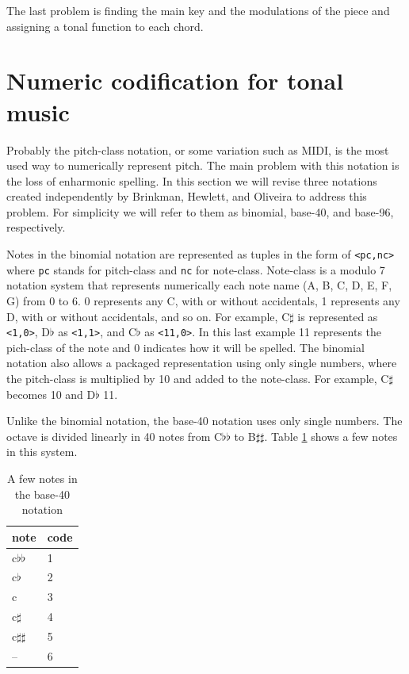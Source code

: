 \documentclass{article}
\begin{document}
The last problem is finding the main key and the modulations of the
piece and assigning a tonal function to each chord.

\section{Numeric codification for tonal music}
\label{sec:codificacao-jamary}

Probably the pitch-class notation, or some variation such as MIDI, is
the most used way to numerically represent pitch. The main problem
with this notation is the loss of enharmonic spelling. In this section
we will revise three notations created independently by Brinkman,
Hewlett, and Oliveira \cite{brinkman:binomial,
  hewlett:base-40, oliveira:busca} to address this problem.
For simplicity we will refer to them as binomial, base-40, and
base-96, respectively.

Notes in the binomial notation are represented as tuples in the form
of \texttt{<pc,nc>} where \texttt{pc} stands for pitch-class and
\texttt{nc} for note-class. Note-class is a modulo 7 notation system
that represents numerically each note name (A, B, C, D, E, F, G) from
0 to 6. 0 represents any C, with or without accidentals, 1 represents
any D, with or without accidentals, and so on. For example, C$\sharp$
is represented as \texttt{<1,0>}, D$\flat$ as \texttt{<1,1>}, and C$\flat$
as \texttt{<11,0>}. In this last example 11 represents the pich-class of the
note and 0 indicates how it will be spelled. The binomial notation
also allows a packaged representation using only single numbers, where
the pitch-class is multiplied by 10 and added to the note-class. For
example, C$\sharp$ becomes 10 and D$\flat$ 11.

Unlike the binomial notation, the base-40 notation uses only single
numbers. The octave is divided linearly in 40 notes from C$\flat\flat$
to B$\sharp\sharp$. Table \ref{tab:base40} shows a few notes in this
system.

\begin{table}
  \centering
  \begin{tabular}{l|l}
    note & code \\
    \hline
    c$\flat\flat$ & 1 \\
    c$\flat$ & 2 \\
    c & 3 \\
    c$\sharp$ & 4 \\
    c$\sharp\sharp$ & 5 \\
    -- & 6 \\
  \end{tabular}
  \caption{A few notes in the base-40 notation}
  \label{tab:base40}
\end{table}
\end{document}
